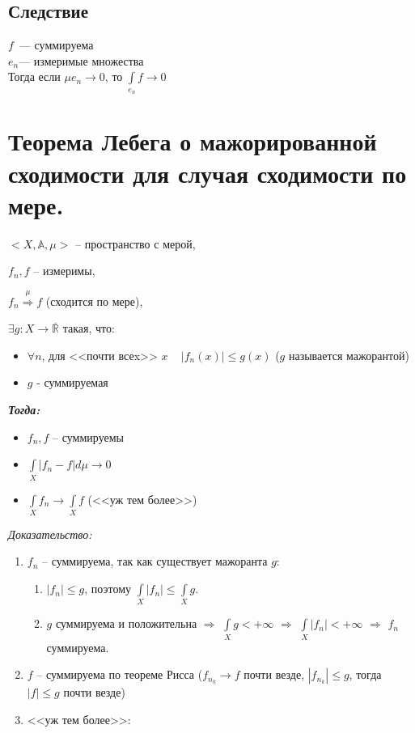 \documentclass[paper=a4, fontsize=14pt]{report}
\begin{document}
	\subsection{Следствие}
	$f$~--- суммируема\\
	$e_n$--- измеримые множества\\

	Тогда если $\mu e_n \rightarrow 0$, то $\int\limits_{e_n}f \rightarrow 0$


\section{Теорема Лебега о мажорированной сходимости для случая сходимости по мере.}
\begin{flushleft}

$<X, \mathds{A}, \mu>$ -- пространство с мерой,

$f_n, f$ -- измеримы,

$f_n\stackrel{\mu}{\Rightarrow}f$ (сходится по мере),

$\exists g : X \rightarrow \overline{\mathds{R}}$ такая, что:
\begin{itemize}
\item
$\forall n$,  для <<почти всеx>> $x$ ~ $|f_n(x)| \leq g(x)$ ($g$ называется мажорантой)
\item
$g$ - суммируемая
\end{itemize}

\emph{\textbf{Тогда:}}
\begin{itemize}
    \item $f_n, f$ -- суммируемы
    \item $\int\limits_{X} |f_n - f| d\mu \rightarrow 0$
    \item $\int\limits_{X} f_n \rightarrow \int\limits_{X} f$ (<<уж тем более>>)
\end{itemize}


\emph{Доказательство:}

\begin{enumerate}
	\item $f_n$ -- суммируема, так как существует мажоранта $g$:\\
    \begin{enumerate}
        \item $|f_n| \leq g$, поэтому $\int\limits_X|f_n| \leq \int\limits_X g$.
        \item $g$ суммируема и положительна $\Rightarrow$ $\int\limits_X g < +\infty$ $\Rightarrow$ $\int\limits_X|f_n| < +\infty$
        $\Rightarrow$ $f_n$ суммируема.
    \end{enumerate}
	\item $f$ -- суммируема по теореме Рисса ($f_{n_k} \rightarrow f $ почти везде, $ |f_{n_k}| \leq g$, тогда $|f| \leq g$ почти везде)
	\item <<уж тем более>>:


\end{enumerate}
\end{flushleft}
\end{document}
